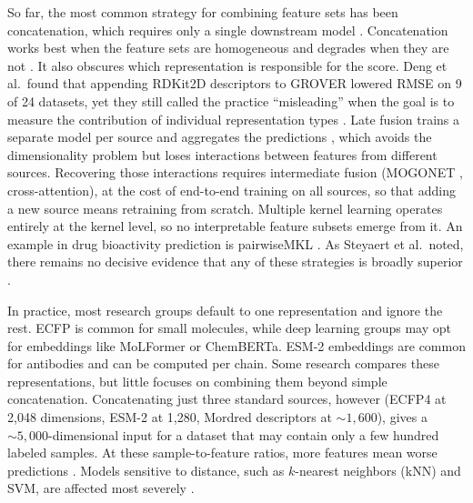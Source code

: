 So far, the most common strategy for combining feature sets has been concatenation, which requires only a single downstream model \citep{Stahlschmidt2022}. Concatenation works best when the feature sets are homogeneous and degrades when they are not \citep{Stahlschmidt2022}. It also obscures which representation is responsible for the score. Deng et al.\ found that appending RDKit2D descriptors to GROVER lowered RMSE on 9 of 24 datasets, yet they still called the practice ``misleading'' when the goal is to measure the contribution of individual representation types \citep{Deng2023}. Late fusion trains a separate model per source and aggregates the predictions \citep{Steyaert2023}, which avoids the dimensionality problem but loses interactions between features from different sources. Recovering those interactions requires intermediate fusion (MOGONET \citep{Wang2021}, cross-attention), at the cost of end-to-end training on all sources, so that adding a new source means retraining from scratch. Multiple kernel learning \citep{Gonen2011} operates entirely at the kernel level, so no interpretable feature subsets emerge from it. An example in drug bioactivity prediction is pairwiseMKL \citep{Cichonska2018}. As Steyaert et al.\ noted, there remains no decisive evidence that any of these strategies is broadly superior \citep{Steyaert2023}.

In practice, most research groups default to one representation and ignore the rest. ECFP is common for small molecules, while deep learning groups may opt for embeddings like MoLFormer or ChemBERTa. ESM-2 embeddings are common for antibodies and can be computed per chain. Some research compares these representations, but little focuses on combining them beyond simple concatenation. Concatenating just three standard sources, however (ECFP4 at 2,048 dimensions, ESM-2 at 1,280, Mordred descriptors at ${\sim}1{,}600$), gives a ${\sim}5{,}000$-dimensional input for a dataset that may contain only a few hundred labeled samples. At these sample-to-feature ratios, more features mean worse predictions \citep{Hughes1968, Bellman1961}. Models sensitive to distance, such as $k$-nearest neighbors (kNN) and SVM, are affected most severely \citep{FernandezDelgado2014}.

